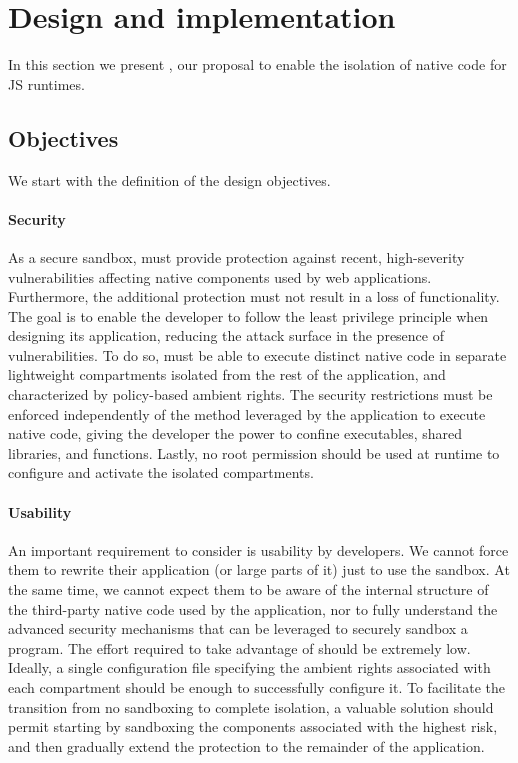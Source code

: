 \section{Design and implementation}
\label{sect:design-and-implementation}

In this section we present \natisand, our proposal to enable the isolation
of native code for JS runtimes.

\subsection{Objectives}
\label{subsect:objectives}

We start with the definition of the design objectives.

\paragraph{Security}
As a secure sandbox, \natisand must provide protection against recent,
high-severity vulnerabilities affecting native components used by web
applications. Furthermore, the additional protection must not result
in a loss of functionality. The goal is to enable the developer to
follow the least privilege principle when designing its application,
reducing the attack surface in the presence of vulnerabilities.  To do
so, \natisand must be able to execute distinct native code in separate lightweight
compartments isolated from the rest of the application, and
characterized by policy-based ambient rights. The security
restrictions must be enforced independently of the method leveraged by
the application to execute native code, giving the developer the power
to confine executables, shared libraries, and functions. Lastly, no
root permission should be used at runtime to configure and activate
the isolated compartments.

\paragraph{Usability}
An important requirement to consider is usability by developers.  We
cannot force them to rewrite their application (or large parts of it)
just to use the sandbox. At the same time, we cannot expect them to be
aware of the internal structure of the third-party native code used by
the application, nor to fully understand the advanced security
mechanisms that can be leveraged to securely sandbox a program. The
effort required to take advantage of \natisand should be extremely
low. Ideally, a single configuration file specifying the ambient
rights associated with each compartment should be enough to
successfully configure it. To facilitate the transition from no
sandboxing to complete isolation, a valuable solution should permit
starting by sandboxing the components associated with the highest risk,
and then gradually extend the protection to the remainder of the
application.

